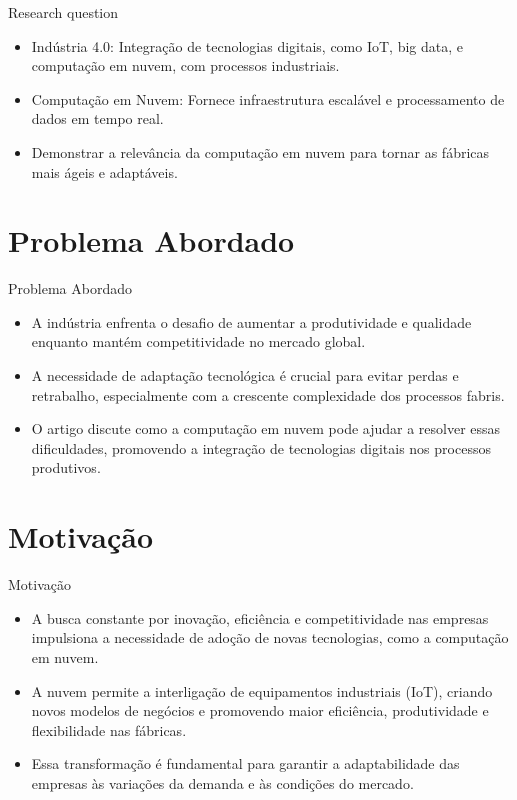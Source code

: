 \documentclass[serif, aspectratio=169]{beamer}
\begin{document}
\begin{frame}{Research question}

		\begin{itemize}
			\item Indústria 4.0: Integração de tecnologias digitais, como IoT, big data, e computação em nuvem, com processos industriais.
			\item Computação em Nuvem: Fornece infraestrutura escalável e processamento de dados em tempo real.
			\item Demonstrar a relevância da computação em nuvem para tornar as fábricas mais ágeis e adaptáveis.
		\end{itemize}

\end{frame}

\section{Problema Abordado}
\begin{frame}{Problema Abordado}
    \begin{itemize}
        \item A indústria enfrenta o desafio de aumentar a produtividade e qualidade enquanto mantém competitividade no mercado global.
\item A necessidade de adaptação tecnológica é crucial para evitar perdas e retrabalho, especialmente com a crescente complexidade dos processos fabris.
\item O artigo discute como a computação em nuvem pode ajudar a resolver essas dificuldades, promovendo a integração de tecnologias digitais nos processos produtivos.
    \end{itemize}

\end{frame}



\section{Motivação}
\begin{frame}{Motivação}
    \begin{itemize}
        \item A busca constante por inovação, eficiência e competitividade nas empresas impulsiona a necessidade de adoção de novas tecnologias, como a computação em nuvem.
        \item A nuvem permite a interligação de equipamentos industriais (IoT), criando novos modelos de negócios e promovendo maior eficiência, produtividade e flexibilidade nas fábricas.
        \item Essa transformação é fundamental para garantir a adaptabilidade das empresas às variações da demanda e às condições do mercado.
    \end{itemize}
\end{frame}
\end{document}

